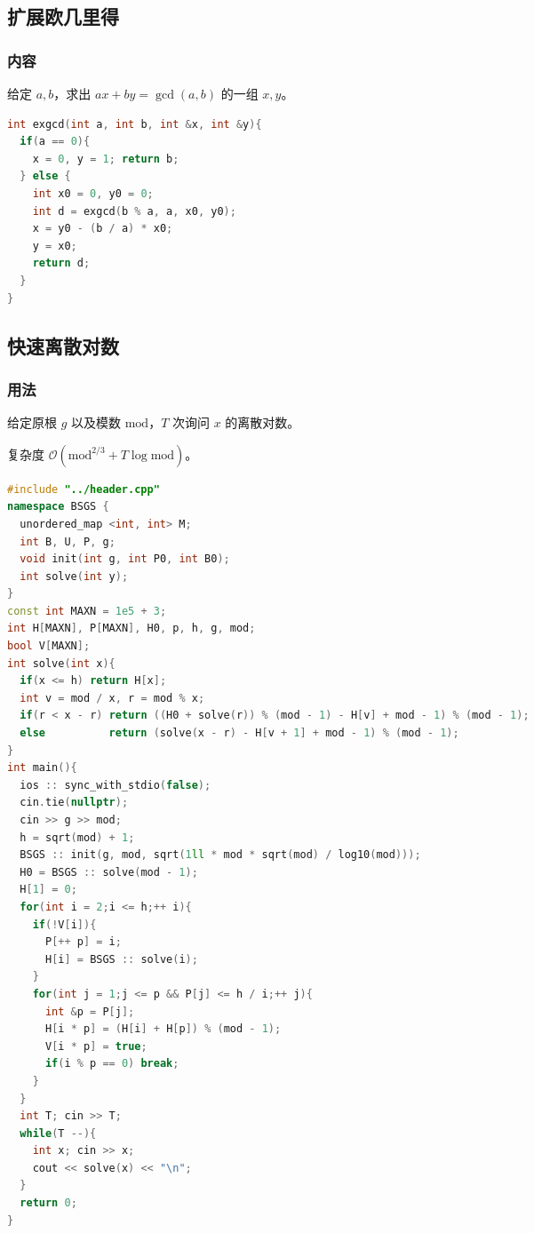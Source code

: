 \documentclass[10pt]{ctexart}
\begin{document}
\begin{multicols}{3}
    \subsection{扩展欧几里得}\label{ux6269ux5c55ux6b27ux51e0ux91ccux5f97}

    \subsubsection{内容}\label{ux5185ux5bb9}

    给定 \(a, b\)，求出 \(ax+by=\gcd(a, b)\) 的一组 \(x, y\)。

\begin{lstlisting}[language={C++}]
int exgcd(int a, int b, int &x, int &y){
  if(a == 0){
    x = 0, y = 1; return b;
  } else {
    int x0 = 0, y0 = 0;
    int d = exgcd(b % a, a, x0, y0);
    x = y0 - (b / a) * x0;
    y = x0;
    return d;
  }
}
\end{lstlisting}

    \subsection{快速离散对数}\label{ux5febux901fux79bbux6563ux5bf9ux6570}

    \subsubsection{用法}\label{ux7528ux6cd5-7}

    给定原根 \(g\) 以及模数 \(\mathrm{mod}\)，\(T\) 次询问 \(x\)
    的离散对数。

    复杂度 \(\mathcal O(\mathrm{mod}^{2/3} + T \log \mathrm{mod})\)。

\begin{lstlisting}[language={C++}]
#include "../header.cpp"
namespace BSGS {
  unordered_map <int, int> M;
  int B, U, P, g;
  void init(int g, int P0, int B0);
  int solve(int y);
}
const int MAXN = 1e5 + 3;
int H[MAXN], P[MAXN], H0, p, h, g, mod;
bool V[MAXN];
int solve(int x){
  if(x <= h) return H[x];
  int v = mod / x, r = mod % x;
  if(r < x - r) return ((H0 + solve(r)) % (mod - 1) - H[v] + mod - 1) % (mod - 1);
  else          return (solve(x - r) - H[v + 1] + mod - 1) % (mod - 1);
}
int main(){
  ios :: sync_with_stdio(false);
  cin.tie(nullptr);
  cin >> g >> mod;
  h = sqrt(mod) + 1;
  BSGS :: init(g, mod, sqrt(1ll * mod * sqrt(mod) / log10(mod)));
  H0 = BSGS :: solve(mod - 1);
  H[1] = 0;
  for(int i = 2;i <= h;++ i){
    if(!V[i]){
      P[++ p] = i;
      H[i] = BSGS :: solve(i);
    }
    for(int j = 1;j <= p && P[j] <= h / i;++ j){
      int &p = P[j];
      H[i * p] = (H[i] + H[p]) % (mod - 1);
      V[i * p] = true;
      if(i % p == 0) break;
    }
  }
  int T; cin >> T;
  while(T --){
    int x; cin >> x;
    cout << solve(x) << "\n";
  }
  return 0;
}
\end{lstlisting}


\end{multicols}
\end{document}
